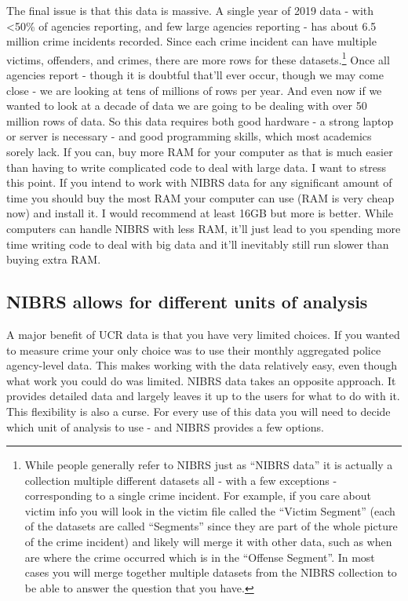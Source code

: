 \documentclass[
]{krantz}
\begin{document}
The final issue is that this data is massive. A single year
of 2019 data - with \textless50\% of agencies reporting, and
few large agencies reporting - has about 6.5 million crime
incidents recorded. Since each crime incident can have
multiple victims, offenders, and crimes, there are more rows
for these datasets.\footnote{While people generally refer to
  NIBRS just as ``NIBRS data'' it is actually a collection
  multiple different datasets all - with a few exceptions -
  corresponding to a single crime incident. For example, if
  you care about victim info you will look in the victim
  file called the ``Victim Segment'' (each of the datasets
  are called ``Segments'' since they are part of the whole
  picture of the crime incident) and likely will merge it
  with other data, such as when are where the crime occurred
  which is in the ``Offense Segment''. In most cases you
  will merge together multiple datasets from the NIBRS
  collection to be able to answer the question that you
  have.} Once all agencies report - though it is doubtful
that'll ever occur, though we may come close - we are
looking at tens of millions of rows per year. And even now
if we wanted to look at a decade of data we are going to be
dealing with over 50 million rows of data. So this data
requires both good hardware - a strong laptop or server is
necessary - and good programming skills, which most
academics sorely lack. If you can, buy more RAM for your
computer as that is much easier than having to write
complicated code to deal with large data. I want to stress
this point. If you intend to work with NIBRS data for any
significant amount of time you should buy the most RAM your
computer can use (RAM is very cheap now) and install it. I
would recommend at least 16GB but more is better. While
computers can handle NIBRS with less RAM, it'll just lead to
you spending more time writing code to deal with big data
and it'll inevitably still run slower than buying extra RAM.

\subsection{NIBRS allows for different units of
analysis}\label{nibrs-allows-for-different-units-of-analysis}

A major benefit of UCR data is that you have very limited
choices. If you wanted to measure crime your only choice was
to use their monthly aggregated police agency-level data.
This makes working with the data relatively easy, even
though what work you could do was limited. NIBRS data takes
an opposite approach. It provides detailed data and largely
leaves it up to the users for what to do with it. This
flexibility is also a curse. For every use of this data you
will need to decide which unit of analysis to use - and
NIBRS provides a few options.
\end{document}
